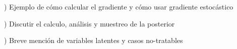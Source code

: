 \begin{mdframed}[style=pendiente, frametitle={\center Cosas pendiente}]

) Ejemplo de cómo calcular el gradiente y cómo usar gradiente estocástico

) Discutir el calculo, análisis y muestreo de la posterior 

) Breve mención de variables latentes y casos no-tratables 


\end{mdframed}











